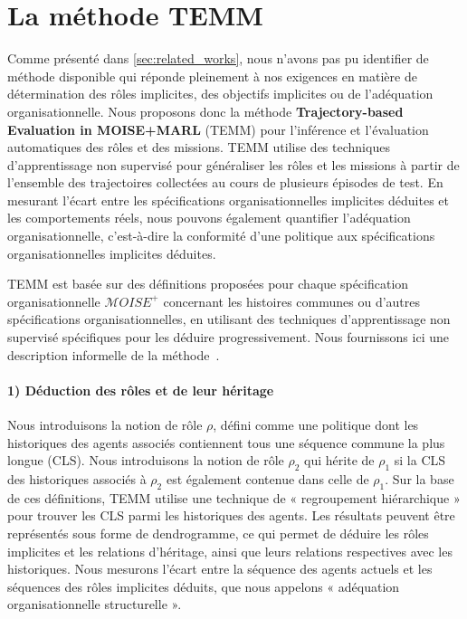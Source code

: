 \section{La méthode TEMM}
\label{sec:TEMM_algorithm}

Comme présenté dans \autoref{sec:related_works}, nous n'avons pas pu identifier de méthode disponible qui réponde pleinement à nos exigences en matière de détermination des rôles implicites, des objectifs implicites ou de l'adéquation organisationnelle. Nous proposons donc la méthode \textbf{Trajectory-based Evaluation in MOISE+MARL} (TEMM) pour l'inférence et l'évaluation automatiques des rôles et des missions.
%
TEMM utilise des techniques d'apprentissage non supervisé pour généraliser les rôles et les missions à partir de l'ensemble des trajectoires collectées au cours de plusieurs épisodes de test. En mesurant l'écart entre les spécifications organisationnelles implicites déduites et les comportements réels, nous pouvons également quantifier l'adéquation organisationnelle, c'est-à-dire la conformité d'une politique aux spécifications organisationnelles implicites déduites.

TEMM est basée sur des définitions proposées pour chaque spécification organisationnelle $\mathcal{M}OISE^+$ concernant les histoires communes ou d'autres spécifications organisationnelles, en utilisant des techniques d'apprentissage non supervisé spécifiques pour les déduire progressivement. Nous fournissons ici une description informelle de la méthode~\hyperref[fn:github]{\footnotemark[1]}.
%

\paragraph{\textbf{1) Déduction des rôles et de leur héritage}}

Nous introduisons la notion de rôle $\rho$, défini comme une politique dont les historiques des agents associés contiennent tous une séquence commune la plus longue (CLS). Nous introduisons la notion de rôle $\rho_2$ qui hérite de $\rho_1$ si la CLS des historiques associés à $\rho_2$ est également contenue dans celle de $\rho_1$.
Sur la base de ces définitions, TEMM utilise une technique de « regroupement hiérarchique » pour trouver les CLS parmi les historiques des agents. Les résultats peuvent être représentés sous forme de dendrogramme, ce qui permet de déduire les rôles implicites et les relations d'héritage, ainsi que leurs relations respectives avec les historiques.
Nous mesurons l'écart entre la séquence des agents actuels et les séquences des rôles implicites déduits, que nous appelons « adéquation organisationnelle structurelle ».

